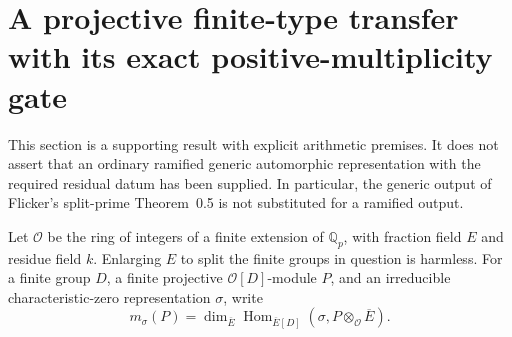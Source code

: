 \section{A projective finite-type transfer with its exact positive-multiplicity gate}
\label{sec:cubic-projective-type-transfer}

This section is a supporting result with explicit arithmetic premises.  It does not assert
that an ordinary ramified generic automorphic representation with the
required residual datum has been supplied.  In particular, the generic
output of Flicker's split-prime Theorem~0.5 is not substituted for a
ramified output.

Let \(\mathcal O\) be the ring of integers of a finite extension of
\(\mathbb Q_p\), with fraction field \(E\) and residue field \(k\).
Enlarging \(E\) to split the finite groups in question is harmless.
For a finite group \(D\), a finite projective \(\mathcal O[D]\)-module
\(P\), and an irreducible characteristic-zero representation \(\sigma\),
write
\[
 m_\sigma(P)=
 \dim_{\overline E}\operatorname{Hom}_{\overline E[D]}
       (\sigma,P\otimes_{\mathcal O}\overline E).
 \tag{G72.1}
\]

